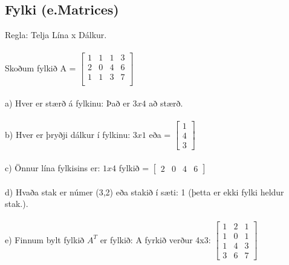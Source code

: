 \setcounter{subsection}{5}
\subsection{Fylki (e.Matrices)}
Regla: Telja Lína x Dálkur.\\ 
\\
Skoðum fylkið A =
$\begin{bmatrix}
    1 & 1 & 1 & 3 \\
    2 & 0 & 4 & 6 \\
    1 & 1 & 3 & 7 \\
\end{bmatrix}$\\
\\
a) Hver er stærð á fylkinu: Það er $3x4$ að stærð.\\
\\
b) Hver er þryðji dálkur í fylkinu: $3x1$ eða = 
$\begin{bmatrix}
    1 \\
    4 \\
    3
\end{bmatrix}$\\
\\
c) Önnur lína fylkisins er: $1x4$ fylkið =
$\begin{bmatrix}
    2 & 0 & 4 & 6
\end{bmatrix}$\\
\\
d) Hvaða stak er númer (3,2) eða stakið í sæti: 1 (þetta er ekki fylki heldur stak.).\\
\\
e) Finnum bylt fylkið $A^T$ er fylkið: A fyrkið verður 4x3: 
$\begin{bmatrix}
    1 & 2 & 1 \\
    1 & 0 & 1 \\
    1 & 4 & 3 \\
    3 & 6 & 7
\end{bmatrix}$

\vspace*{-1.6em}

